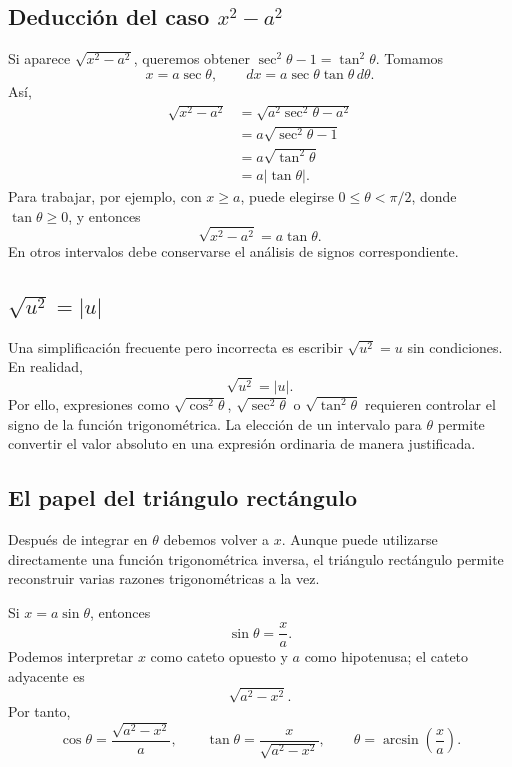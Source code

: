 \documentclass[12pt]{article}
\theoremstyle{definition}
\theoremstyle{remark}
\begin{document}
\subsection*{Deducción del caso \texorpdfstring{$x^2-a^2$}{x2-a2}}

Si aparece $\sqrt{x^2-a^2}$, queremos obtener $\sec^2\theta-1=\tan^2\theta$. Tomamos
\[
x=a\sec\theta,
\qquad dx=a\sec\theta\tan\theta\,d\theta.
\]
Así,
\begin{align*}
\sqrt{x^2-a^2}
&=\sqrt{a^2\sec^2\theta-a^2}\\
&=a\sqrt{\sec^2\theta-1}\\
&=a\sqrt{\tan^2\theta}\\
&=a|\tan\theta|.
\end{align*}
Para trabajar, por ejemplo, con $x\ge a$, puede elegirse $0\le\theta<\pi/2$, donde $\tan\theta\ge0$, y entonces
\[
\sqrt{x^2-a^2}=a\tan\theta.
\]
En otros intervalos debe conservarse el análisis de signos correspondiente.

\subsection*{\texorpdfstring{$\sqrt{u^2}=|u|$}{sqrt(u2)=abs(u)}}

Una simplificación frecuente pero incorrecta es escribir $\sqrt{u^2}=u$ sin condiciones. En realidad,
\[
\sqrt{u^2}=|u|.
\]
Por ello, expresiones como $\sqrt{\cos^2\theta}$, $\sqrt{\sec^2\theta}$ o $\sqrt{\tan^2\theta}$ requieren controlar el signo de la función trigonométrica. La elección de un intervalo para $\theta$ permite convertir el valor absoluto en una expresión ordinaria de manera justificada.

\subsection*{El papel del triángulo rectángulo}

Después de integrar en $\theta$ debemos volver a $x$. Aunque puede utilizarse directamente una función trigonométrica inversa, el triángulo rectángulo permite reconstruir varias razones trigonométricas a la vez.

Si $x=a\sin\theta$, entonces
\[
\sin\theta=\frac{x}{a}.
\]
Podemos interpretar $x$ como cateto opuesto y $a$ como hipotenusa; el cateto adyacente es
\[
\sqrt{a^2-x^2}.
\]
Por tanto,
\[
\cos\theta=\frac{\sqrt{a^2-x^2}}{a},
\qquad
\tan\theta=\frac{x}{\sqrt{a^2-x^2}},
\qquad
\theta=\arcsin\left(\frac{x}{a}\right).
\]
\end{document}
